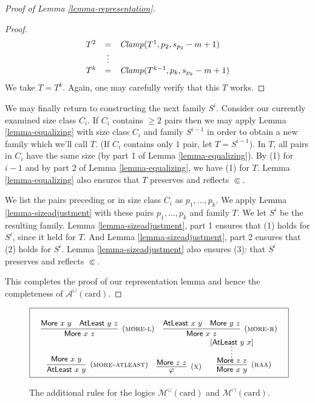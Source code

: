 \documentclass[letterpaper]{article}
\theoremstyle{definition}
\newcommand{\Aunion}{\mathscr{A}^{\cup}}
\newcommand{\Munion}{\mathscr{M}^{\cup}}
\newcommand{\Minter}{\mathscr{M}^{\cap}}
\newcommand{\proverule}{\textsc}
\newcommand{\morel}{\proverule{more-l}}
\newcommand{\morer}{\proverule{more-r}}
\newcommand{\moreatleast}{\proverule{more-atleast}}
\newcommand{\x}{\proverule{x}}
\newcommand{\raa}{\proverule{raa}}
\newcommand{\Atleast}[2]{\mathsf{AtLeast}\,\,#1\,\,#2}
\newcommand{\More}[2]{\mathsf{More}\,\,#1\,\,#2}
\newcommand{\card}{\mathrm{card}}
\newcommand{\Clamp}{\protect{\mbox{\textit{Clamp}}}}
\newcommand{\precsubseteq}{\Subset}
\begin{document}
\begin{proof}[Proof of Lemma \ref{lemma-representation}]
\begin{proof}
\[\begin{array}{lcl}
T^2 & = & \Clamp(T^1,p_2,  s_{p_2}-m + 1 )\\
  & \vdots   & \\
T^{k} & = & \Clamp(T^{k-1},p_k, s_{p_k}-m + 1 )\\
\end{array}
\]
We take $T = T^{k}$.  Again, one may carefully verify that this $T$ works.  %
\end{proof}


We may finally return to constructing the next family $S^i$.  Consider our currently examined size class $C_i$.  If $C_i$ contains $\ge 2$ pairs then we may apply Lemma \ref{lemma-equalizing} with size class $C_i$ and family $S^{i-1}$ in order to obtain a new family which we'll call $T$.  (If $C_i$ contains only $1$ pair, let $T = S^{i-1}$).  In $T$, all pairs in $C_i$ have the same size (by part 1 of Lemma \ref{lemma-equalizing}).  By (1) for $i-1$ and by part 2 of Lemma \ref{lemma-equalizing}, we have (1) for $T$.  Lemma \ref{lemma-equalizing} also ensures that $T$ preserves and reflects $\precsubseteq$.

We list the pairs preceding or in size class $C_i$ as $p_1, \ldots, p_k$.  We apply Lemma \ref{lemma-sizeadjustment} with these pairs $p_1, \ldots, p_k$ and family $T$.  We let $S^i$ be the resulting family.  Lemma \ref{lemma-sizeadjustment}, part 1 ensures that (1) holds for $S^i$, since it held for $T$.  And Lemma \ref{lemma-sizeadjustment}, part 2 ensures that (2) holds for $S^i$.  Lemma \ref{lemma-sizeadjustment} also ensures (3): that $S^i$ preserves and reflects $\precsubseteq$.

This completes the proof of our representation lemma and hence the completeness of $\Aunion(\card)$.
\end{proof}

\begin{figure*}[ht!]
\begin{equation*}
\boxed{
\small
\begin{array}{c}
\begin{array}{ccc}
\\ 
\infer[(\morel)]
    {\More{x}{z}}
    {\More{x}{y} & \Atleast{y}{z}} 
&
\infer[(\morer)]
    {\More{x}{z}}
    {\Atleast{x}{y} & \More{y}{z}}
\end{array}
\\%
\begin{array}{ccc}
\infer[(\moreatleast)]
    {\Atleast{x}{y}}
    {\More{x}{y}}
&
\infer[(\x)]
    {\varphi}
    {\More{z}{z}}
&
\infer[(\raa)]
     {\More{x}{y}}
     {\inferLineSkip=0pt
     \infer*
        {\More{z}{z}}
        {[\Atleast{y}{x}]}}
\end{array}
\\
\end{array}
}
\end{equation*}
\caption{The additional rules for the logics $\Munion(\card)$ and $\Minter(\card)$.
\label{fig-more-rules}}
\end{figure*}
\end{document}
